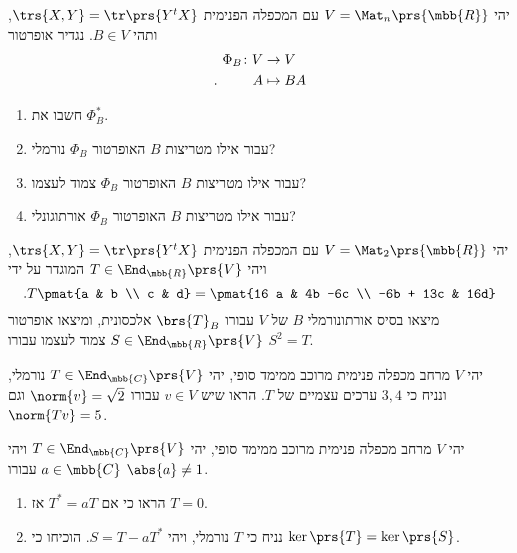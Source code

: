 \documentclass[a4paper,10pt,twoside,openany]{article}
\begin{document}
\begin{exercise}
יהי
$V = \Mat_n\prs{\mbb{R}}$
עם המכפלה הפנימית
$\trs{X,Y} = \tr\prs{Y^t X}$,
ותהי
$B \in V$.
נגדיר אופרטור
\begin{align*}
\Phi_B \colon V &\to V \\
\text{.} \hphantom{lalala} A &\mapsto BA
\end{align*}
\begin{enumerate}
\item
חשבו את
$\Phi_B^*$.
\item
עבור אילו מטריצות
$B$
האופרטור
$\Phi_B$
נורמלי?
\item
עבור אילו מטריצות
$B$
האופרטור
$\Phi_B$
צמוד לעצמו?
\item
עבור אילו מטריצות
$B$
האופרטור
$\Phi_B$
אורתוגונלי?
\end{enumerate}
\end{exercise}

\begin{exercise}
יהי
$V = \Mat_2\prs{\mbb{R}}$
עם המכפלה הפנימית
$\trs{X,Y} = \tr\prs{Y^t X}$,
ויהי
$T \in \End_{\mbb{R}}\prs{V}$
המוגדר על ידי
\[\text{.} T\pmat{a & b \\ c & d} = \pmat{16 a & 4b -6c \\ -6b + 13c & 16d}\]
מיצאו בסיס אורתונורמלי
$B$
של
$V$
עבורו
$\brs{T}_B$
אלכסונית, ומיצאו אופרטור
$S \in \End_{\mbb{R}}\prs{V}$
צמוד לעצמו עבורו
$S^2 = T$.
\end{exercise}

\begin{exercise}
יהי
$V$
מרחב מכפלה פנימית מרוכב ממימד סופי, יהי
$T \in \End_{\mbb{C}}\prs{V}$
נורמלי, ונניח כי
$3,4$
ערכים עצמיים של
$T$.
הראו שיש
$v \in V$
עבורו
$\norm{v} = \sqrt{2}$
וגם
$\norm{Tv} = 5$.
\end{exercise}

\begin{exercise}
יהי
$V$
מרחב מכפלה פנימית מרוכב ממימד סופי, יהי
$T \in \End_{\mbb{C}}\prs{V}$
ויהי
$a \in \mbb{C}$
עבורו
$\abs{a} \neq 1$.

\begin{enumerate}
\item הראו כי אם
$T^* = aT$
אז
$T = 0$.

\item נניח כי
$T$
נורמלי, ויהי
$S = T - a T^*$.
הוכיחו כי
$\ker\prs{T} = \ker\prs{S}$.
\end{enumerate}
\end{exercise}
\end{document}
